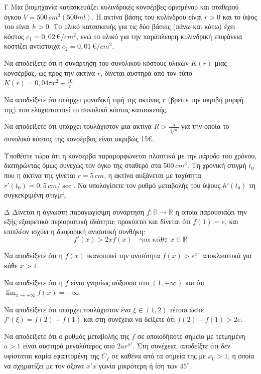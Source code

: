\begin{thema}{Γ}
Μια βιομηχανία κατασκευάζει κυλινδρικές κονσέρβες ορισμένου και σταθερού όγκου $V = 500 \, \si{cm}^3 (500 \si{ml})$. Η ακτίνα βάσης του κυλίνδρου είναι $r > 0$ και το ύψος του είναι $h > 0$. Το υλικό κατασκευής για τις δύο βάσεις (πάνω και κάτω) έχει κόστος $c_1 = 0,02 \, \euro/\si{cm}^2$, ενώ το υλικό για την παράπλευρη κυλινδρική επιφάνεια κοστίζει αντίστοιχα $c_2 = 0,01 \, \euro/\si{cm}^2$. 
\begin{erwthma}
    \item Να αποδείξετε ότι η συνάρτηση του συνολικού κόστους υλικών $K(r)$ μιας κονσέρβας, ως προς την ακτίνα $r$, δίνεται αυστηρά από τον τύπο $K(r) = 0,04 \pi r^2 + \frac{10}{r}$. 
    \item Να αποδείξετε ότι υπάρχει μοναδική τιμή της ακτίνας $r$ (βρείτε την ακριβή μορφή της) που ελαχιστοποιεί το συνολικό κόστος κατασκευής. 
    \item Να αποδείξετε ότι υπάρχει τουλάχιστον μια ακτίνα $R > \frac{5}{\sqrt[3]{\pi}}$ για την οποία το συνολικό κόστος της κονσέρβας είναι ακριβώς 15\euro. 
    \item Υποθέστε τώρα ότι η κονσέρβα παραμορφώνεται πλαστικά με την πάροδο του χρόνου, διατηρώντας όμως συνεχώς τον όγκο της σταθερό στα $500 \, \si{cm}^3$. Τη χρονική στιγμή $t_0$ που η ακτίνα της γίνεται $r=5 \, \si{cm}$, η ακτίνα αυξάνεται με ταχύτητα $r'(t_0) = 0,5 \, \si{cm}/\sec$. Να υπολογίσετε τον ρυθμό μεταβολής του ύψους $h'(t_0)$ τη συγκεκριμένη στιγμή. 
\end{erwthma}
\end{thema}

\begin{thema}{Δ}
Δίνεται η άγνωστη παραγωγίσιμη συνάρτηση $f: \mathbb{R} \to \mathbb{R}$ η οποία παρουσιάζει την εξής εξαιρετικά περιοριστική ιδιότητα: προκύπτει και δίνεται ότι $f(1) = e$, και επιπλέον ισχύει η διαφορική ανισοτική συνθήκη:
\[ f'(x) > 2x f(x) \quad \text{για κάθε } x \in \mathbb{R} \]
\begin{erwthma}
    \item Να αποδείξετε ότι η $f(x)$ ικανοποιεί την ανισότητα $f(x) > e^{x^2}$ αποκλειστικά για κάθε $x > 1$. 
    \item Να αποδείξετε ότι η $f$ είναι γνησίως αύξουσα στο $(1, +\infty)$ και ότι $\displaystyle\lim_{x \to +\infty} f(x) = +\infty$. 
    \item Να αποδείξετε ότι υπάρχει τουλάχιστον ένα $\xi \in (1, 2)$ τέτοιο ώστε $f'(\xi) = f(2) - f(1)$ και στη συνέχεια να δείξετε ότι $f(2) - f(1) > 2e$. 
    \item Να αποδείξετε ότι ο ρυθμός μεταβολής της $f$ σε οποιοδήποτε σημείο με τετμημένη $a > 1$ είναι αυστηρά μεγαλύτερος από $2a e^{a^2}$. Στη συνέχεια, αποδείξτε ότι δεν υφίσταται καμία εφαπτομένη της $C_f$ σε καθένα από τα σημεία της με $x_0 > 1$, η οποία να σχηματίζει με τον άξονα $x'x$ γωνία μικρότερη ή ίση των $45^\circ$. 
\end{erwthma}
\end{thema}

